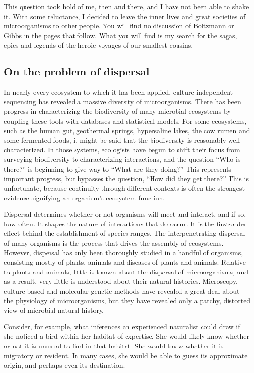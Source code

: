 This question took hold of me, then and there, and I have not been able to shake it. With some reluctance, I decided to leave the inner lives and great societies of microorganisms to other people. You will find no discussion of Boltzmann or Gibbs in the pages that follow. What you will find is my search for the sagas, epics and legends of the heroic voyages of our smallest cousins.

\subsection*{On the problem of dispersal}

In nearly every ecosystem to which it has been applied, culture-independent sequencing has revealed a massive diversity of microorganisms. There has been progress in characterizing the biodiversity of many microbial ecosystems by coupling these tools with databases and statistical models. For some ecosystems, such as the human gut, geothermal springs, hypersaline lakes, the cow rumen and some fermented foods, it might be said that the biodiversity is reasonably well characterized. In those systems, ecologists have begun to shift their focus from surveying biodiversity to characterizing interactions, and the question ``Who is there?'' is beginning to give way to ``What are they doing?'' This represents important progress, but bypasses the question, ``How did they get there?'' This is unfortunate, because continuity through different contexts is often the strongest evidence signifying an organism's ecosystem function.

Dispersal determines whether or not organisms will meet and interact, and if so, how often. It shapes the nature of interactions that do occur. It is the first-order effect behind the establishment of species ranges. The interpenetrating dispersal of many organisms is the process that drives the assembly of ecosystems. However, dispersal has only been thoroughly studied in a handful of organisms, consisting mostly of plants, animals and diseases of plants and animals. Relative to plants and animals, little is known about the dispersal of microorganisms, and as a result, very little is understood about their natural histories. Microscopy, culture-based and molecular genetic methods have revealed a great deal about the physiology of microorganisms, but they have revealed only a patchy, distorted view of microbial natural history. \cite{staley1985measurement, epstein2013phenomenon}

Consider, for example, what inferences an experienced naturalist could draw if she noticed a bird within her habitat of expertise. She would likely know whether or not it is unusual to find in that habitat. She would know whether it is migratory or resident. In many cases, she would be able to guess its approximate origin, and perhaps even its destination.

